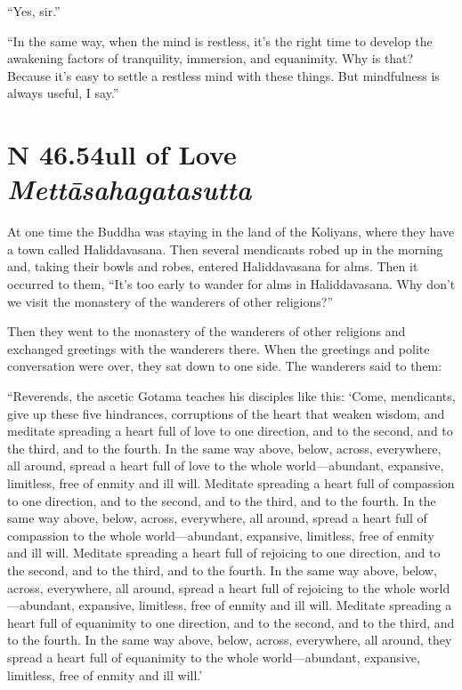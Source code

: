 \documentclass[12pt,openany]{book}%
\newcommand*{\suttatitleacronym}[1]{\smaller[2]{#1}\vspace*{.3em}}
\newcommand*{\suttatitletranslation}[1]{\linebreak{#1}}
\newcommand*{\suttatitleroot}[1]{\linebreak\smaller[2]\itshape{#1}}
\newcommand*{\tocacronym}[1]{\hspace*{-3.3em}{#1}\quad}
\newcommand*{\toctranslation}[1]{#1}
\newcommand*{\tocroot}[1]{(\textit{#1})}
\begin{document}
“Yes, sir.” 

“In the same way, when the mind is restless, it’s the right time to develop the awakening factors of tranquility, immersion, and equanimity. Why is that? Because it’s easy to settle a restless mind with these things. But mindfulness is always useful, I say.” 

%
\section*{{\suttatitleacronym SN 46.54}{\suttatitletranslation Full of Love }{\suttatitleroot Mettāsahagatasutta}}
\addcontentsline{toc}{section}{\tocacronym{SN 46.54} \toctranslation{Full of Love } \tocroot{Mettāsahagatasutta}}

At one time the Buddha was staying in the land of the Koliyans, where they have a town called Haliddavasana. Then several mendicants robed up in the morning and, taking their bowls and robes, entered Haliddavasana for alms. Then it occurred to them, “It’s too early to wander for alms in Haliddavasana. Why don’t we visit the monastery of the wanderers of other religions?” 

Then they went to the monastery of the wanderers of other religions and exchanged greetings with the wanderers there. When the greetings and polite conversation were over, they sat down to one side. The wanderers said to them: 

“Reverends, the ascetic Gotama teaches his disciples like this: ‘Come, mendicants, give up these five hindrances, corruptions of the heart that weaken wisdom, and meditate spreading a heart full of love to one direction, and to the second, and to the third, and to the fourth. In the same way above, below, across, everywhere, all around, spread a heart full of love to the whole world—abundant, expansive, limitless, free of enmity and ill will. Meditate spreading a heart full of compassion to one direction, and to the second, and to the third, and to the fourth. In the same way above, below, across, everywhere, all around, spread a heart full of compassion to the whole world—abundant, expansive, limitless, free of enmity and ill will. Meditate spreading a heart full of rejoicing to one direction, and to the second, and to the third, and to the fourth. In the same way above, below, across, everywhere, all around, spread a heart full of rejoicing to the whole world—abundant, expansive, limitless, free of enmity and ill will. Meditate spreading a heart full of equanimity to one direction, and to the second, and to the third, and to the fourth. In the same way above, below, across, everywhere, all around, they spread a heart full of equanimity to the whole world—abundant, expansive, limitless, free of enmity and ill will.’ 
\end{document}
